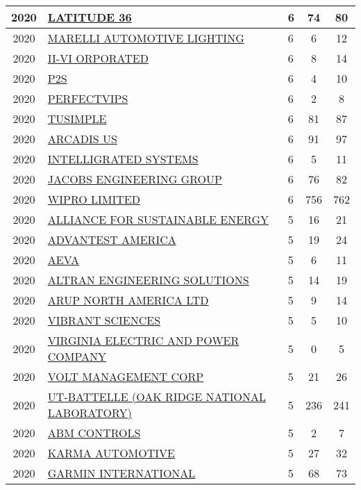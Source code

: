 \documentclass{article}%
\begin{document}
\begin{longtable}{c|p{20em}|p{5em}|c|c}
\hline%
2020&\hyperref[subsec:LATITUDE36]{LATITUDE 36}&6&74&80\\%
\hline%
2020&\hyperref[subsec:MARELLIAUTOMOTIVELIGHTING]{MARELLI AUTOMOTIVE LIGHTING}&6&6&12\\%
\hline%
2020&\hyperref[subsec:II{-}VIORPORATED]{II{-}VI ORPORATED}&6&8&14\\%
\hline%
2020&\hyperref[subsec:P2S]{P2S}&6&4&10\\%
\hline%
2020&\hyperref[subsec:PERFECTVIPS]{PERFECTVIPS}&6&2&8\\%
\hline%
2020&\hyperref[subsec:TUSIMPLE]{TUSIMPLE}&6&81&87\\%
\hline%
2020&\hyperref[subsec:ARCADISUS]{ARCADIS US}&6&91&97\\%
\hline%
2020&\hyperref[subsec:INTELLIGRATEDSYSTEMS]{INTELLIGRATED SYSTEMS}&6&5&11\\%
\hline%
2020&\hyperref[subsec:JACOBSENGINEERINGGROUP]{JACOBS ENGINEERING GROUP}&6&76&82\\%
\hline%
2020&\hyperref[subsec:WIPROLIMITED]{WIPRO LIMITED}&6&756&762\\%
\hline%
2020&\hyperref[subsec:ALLIANCEFORSUSTAINABLEENERGY]{ALLIANCE FOR SUSTAINABLE ENERGY}&5&16&21\\%
\hline%
2020&\hyperref[subsec:ADVANTESTAMERICA]{ADVANTEST AMERICA}&5&19&24\\%
\hline%
2020&\hyperref[subsec:AEVA]{AEVA}&5&6&11\\%
\hline%
2020&\hyperref[subsec:ALTRANENGINEERINGSOLUTIONS]{ALTRAN ENGINEERING SOLUTIONS}&5&14&19\\%
\hline%
2020&\hyperref[subsec:ARUPNORTHAMERICALTD]{ARUP NORTH AMERICA LTD}&5&9&14\\%
\hline%
2020&\hyperref[subsec:VIBRANTSCIENCES]{VIBRANT SCIENCES}&5&5&10\\%
\hline%
2020&\hyperref[subsec:VIRGINIAELECTRICANDPOWERCOMPANY]{VIRGINIA ELECTRIC AND POWER COMPANY}&5&0&5\\%
\hline%
2020&\hyperref[subsec:VOLTMANAGEMENTCORP]{VOLT MANAGEMENT CORP}&5&21&26\\%
\hline%
2020&\hyperref[subsec:UT{-}BATTELLE(OAKRIDGENATIONALLABORATORY)]{UT{-}BATTELLE  (OAK RIDGE NATIONAL LABORATORY)}&5&236&241\\%
\hline%
2020&\hyperref[subsec:ABMCONTROLS]{ABM CONTROLS}&5&2&7\\%
\hline%
2020&\hyperref[subsec:KARMAAUTOMOTIVE]{KARMA AUTOMOTIVE}&5&27&32\\%
\hline%
2020&\hyperref[subsec:GARMININTERNATIONAL]{GARMIN INTERNATIONAL}&5&68&73\\%

\end{longtable}
\end{document}
